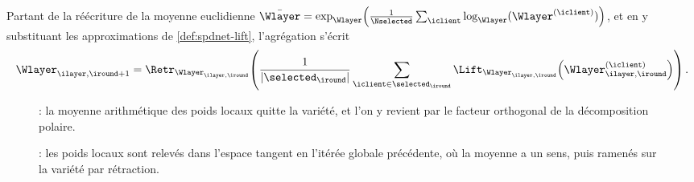 \begin{definition}
\label{def:spdnet-rlavg}
  Partant de la réécriture de la moyenne euclidienne
  $\bar{\Wlayer}=\exp_{\Wlayer}\!\left(\frac{1}{\Nselected}\sum_\iclient\log_{\Wlayer}(\Wlayer^{(\iclient)})\right)$,
  et en y substituant les approximations de \cref{def:spdnet-lift}, l'agrégation
  s'écrit
  \begin{equation}
    \Wlayer_{\ilayer,\iround+1}
    =
    \Retr_{\Wlayer_{\ilayer,\iround}}\!\left(
      \frac{1}{|\selected_\iround|}\sum_{\iclient\in\selected_\iround}
      \Lift_{\Wlayer_{\ilayer,\iround}}\!\left(\Wlayer_{\ilayer,\iround}^{(\iclient)}\right)
    \right).
    \label{eq:spdnet-rlavg}
  \end{equation}
\end{definition}

\begin{figure}[p]
  \begin{center}
    \makebox[\textwidth][c]{}
  \end{center}
  \caption[Agrégation par projection]{: la moyenne
    arithmétique des poids locaux quitte la variété, et l'on y revient par le
    facteur orthogonal de la décomposition polaire. %
  }
  \label{fig:spdnet-projavg}
\end{figure}

\begin{figure}[p]
  \begin{center}
    \makebox[\textwidth][c]{}
  \end{center}
  \caption[Agrégation par relèvement et rétraction]{: les poids
    locaux sont relevés dans l'espace tangent en l'itérée globale précédente, où
    la moyenne a un sens, puis ramenés sur la variété par rétraction.
  }
  \label{fig:spdnet-rlavg}
\end{figure}

